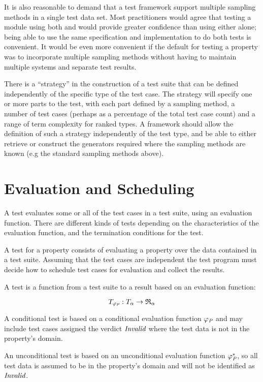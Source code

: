 It is also reasonable to demand that a test framework support
multiple sampling methods in a single test data set.
Most practitioners would agree that testing a module
using both \QC and \SC would provide greater confidence
than using either alone; being able to use the same specification
and implementation to do both tests is convenient.
It would be even more convenient if the default for testing a property
was to incorporate multiple sampling methods without
having to maintain multiple \pbt systems and separate test results.

There is a ``strategy'' in the construction of a test suite
that can be defined independently of the specific type of the test case.
The strategy will specify one or more parts to the test,
with each part defined by a sampling method, 
a number of test cases (perhaps as a percentage of the total test case count)
and a range of term complexity for ranked types.
A \pbt framework should allow the definition of such a strategy independently of the test type,
and be able to either retrieve or construct the generators required
where the sampling methods are known (e.g the standard sampling methods above).


\section{Evaluation and Scheduling}

A test evaluates some or all of the test cases in a test suite,
using an evaluation function.
There are different kinds of tests depending on 
the characteristics of the evaluation function,
and the termination conditions for the test.

A test for a property consists of evaluating a property
over the data contained in a test suite.
Assuming that the test cases are independent 
the test program must decide how to schedule test cases for evaluation
and collect the results.


\begin{df}[Test]
A test is a function from a test suite to a result based on an evaluation function:

$$T_{\varphi_{\emph{P}}} : \emph{\ensuremath{T_{\alpha}}} \rightarrow \mathfrak{R}_{\alpha}$$
\end{df}


\begin{df}
A conditional test is based on a conditional evaluation function $\varphi_{\emph{P}}$ 
and may include test cases assigned the verdict $\emph{Invalid}$ where
the test data is not in the property's domain.
\end{df}
\begin{df}
An unconditional test is based on an unconditional evaluation function $\varphi^*_{\emph{P}}$, 
so all test data is assumed to be in the property's domain
and will not be identified as $\emph{Invalid}$.
\end{df}

